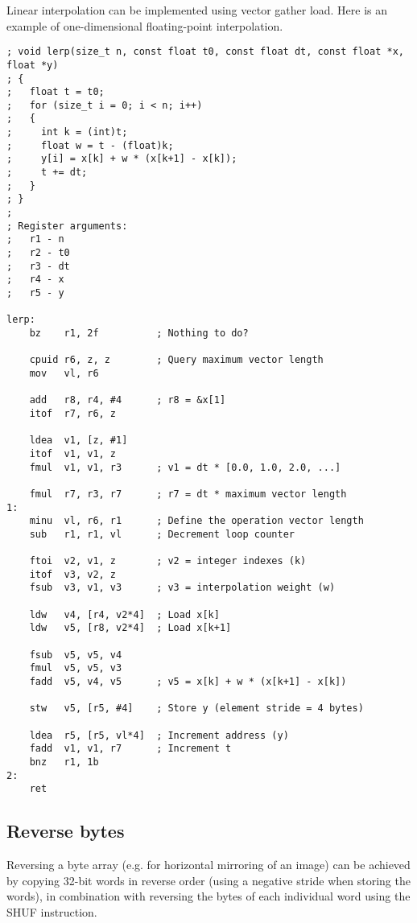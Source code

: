 Linear interpolation can be implemented using vector gather load. Here is an
example of one-dimensional floating-point interpolation.

\begin{lstlisting}[style=assembler]
; void lerp(size_t n, const float t0, const float dt, const float *x, float *y)
; {
;   float t = t0;
;   for (size_t i = 0; i < n; i++)
;   {
;     int k = (int)t;
;     float w = t - (float)k;
;     y[i] = x[k] + w * (x[k+1] - x[k]);
;     t += dt;
;   }
; }
;
; Register arguments:
;   r1 - n
;   r2 - t0
;   r3 - dt
;   r4 - x
;   r5 - y

lerp:
    bz    r1, 2f          ; Nothing to do?

    cpuid r6, z, z        ; Query maximum vector length
    mov   vl, r6

    add   r8, r4, #4      ; r8 = &x[1]
    itof  r7, r6, z

    ldea  v1, [z, #1]
    itof  v1, v1, z
    fmul  v1, v1, r3      ; v1 = dt * [0.0, 1.0, 2.0, ...]

    fmul  r7, r3, r7      ; r7 = dt * maximum vector length
1:
    minu  vl, r6, r1      ; Define the operation vector length
    sub   r1, r1, vl      ; Decrement loop counter

    ftoi  v2, v1, z       ; v2 = integer indexes (k)
    itof  v3, v2, z
    fsub  v3, v1, v3      ; v3 = interpolation weight (w)

    ldw   v4, [r4, v2*4]  ; Load x[k]
    ldw   v5, [r8, v2*4]  ; Load x[k+1]

    fsub  v5, v5, v4
    fmul  v5, v5, v3
    fadd  v5, v4, v5      ; v5 = x[k] + w * (x[k+1] - x[k])

    stw   v5, [r5, #4]    ; Store y (element stride = 4 bytes)

    ldea  r5, [r5, vl*4]  ; Increment address (y)
    fadd  v1, v1, r7      ; Increment t
    bnz   r1, 1b
2:
    ret
\end{lstlisting}

\subsection{Reverse bytes}

Reversing a byte array (e.g. for horizontal mirroring of an image) can be
achieved by copying 32-bit words in reverse order (using a negative stride when
storing the words), in combination with reversing the bytes of each individual
word using the SHUF instruction.

